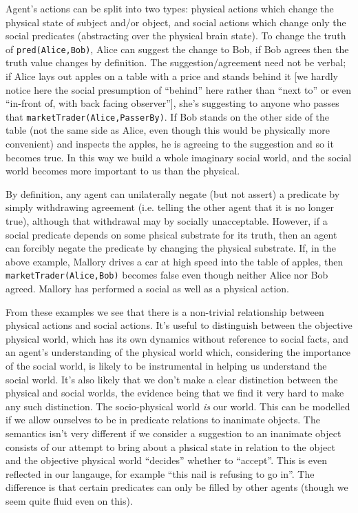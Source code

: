 \documentclass[a4paper]{article}
\begin{document}
Agent's actions can be split into two types: physical actions which change the physical state of subject and/or object, and social actions which change only the social predicates (abstracting over the physical brain state). To change the truth of \texttt{pred(Alice,Bob)}, Alice can suggest the change to Bob, if Bob agrees then the truth value changes by definition. The suggestion/agreement need not be verbal; if Alice lays out apples on a table with a price and stands behind it [we hardly notice here the social presumption of ``behind'' here rather than ``next to'' or even ``in-front of, with back facing observer''], she's suggesting to anyone who passes that \texttt{marketTrader(Alice,PasserBy)}. If Bob stands on the other side of the table (not the same side as Alice, even though this would be physically more convenient) and inspects the apples, he is agreeing to the suggestion and so it becomes true. In this way we build a whole imaginary social world, and the social world becomes more important to us than the physical.

By definition, any agent can unilaterally negate (but not assert) a predicate by simply withdrawing agreement (i.e. telling the other agent that it is no longer true), although that withdrawal may by socially unacceptable. However, if a social predicate depends on some phsical substrate for its truth, then an agent can forcibly negate the predicate by changing the physical substrate. If, in the above example, Mallory drives a car at high speed into the table of apples, then \texttt{marketTrader(Alice,Bob)} becomes false even though neither Alice nor Bob agreed. Mallory has performed a social as well as a physical action.

From these examples we see that there is a non-trivial relationship between physical actions and social actions. It's useful to distinguish between the objective physical world, which has its own dynamics without reference to social facts, and an agent's understanding of the physical world which, considering the importance of the social world, is likely to be instrumental in helping us understand the social world. It's also likely that we don't make a clear distinction between the physical and social worlds, the evidence being that we find it very hard to make any such distinction. The socio-physical world \textit{is} our world. This can be modelled if we allow ourselves to be in predicate relations to inanimate objects. The semantics isn't very different if we consider a suggestion to an inanimate object consists of our attempt to bring about a phsical state in relation to the object and the objective physical world ``decides'' whether to ``accept''. This is even reflected in our langauge, for example ``this nail is refusing to go in''. The difference is that certain predicates can only be filled by other agents (though we seem quite fluid even on this).
\end{document}
